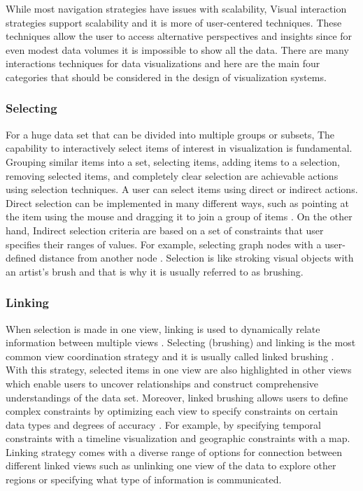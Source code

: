 While most navigation strategies have issues with scalability, Visual interaction strategies support scalability and it is more of user-centered techniques. These techniques allow the user to access alternative perspectives and insights since for even modest data volumes it is impossible to show all the data. There are many interactions techniques for data visualizations \cite{ward2015interactive} and here are the main four categories that should be considered in the design of visualization systems.

\subsubsection{Selecting}

For a huge data set that can be divided into multiple groups or subsets, The capability to interactively select items of interest in visualization is fundamental. Grouping similar items into a set, selecting items, adding items to a selection, removing selected items, and completely clear selection are achievable actions using selection techniques. A user can select items using direct or indirect actions. Direct selection can be implemented in many different ways, such as pointing at the item using the mouse and dragging it to join a group of items \cite{wills1996selection}. On the other hand, Indirect selection criteria are based on a set of constraints that user specifies their ranges of values. For example, selecting graph nodes with a user-defined distance from another node \cite{ward2015interactive}. Selection is like stroking visual objects with an artist’s brush and that is why it is usually referred to as brushing.


\subsubsection{Linking}

When selection is made in one view, linking is used to dynamically relate information between multiple views \cite{north2001multiple,wang2000guidelines}. Selecting (brushing) and linking is the most common view coordination strategy and it is usually called linked brushing \cite{becker1987brushing}. With this strategy, selected items in one view are also highlighted in other views which enable users to uncover relationships and construct comprehensive understandings of the data set. Moreover, linked brushing allows users to define complex constraints by optimizing each view to specify constraints on certain data types and degrees of accuracy \cite{ward2015interactive}. For example, by specifying temporal constraints with a timeline visualization and geographic constraints with a map. Linking strategy comes with a diverse range of options for connection between different linked views such as unlinking one view of the data to explore other regions or specifying what type of information is communicated. 


